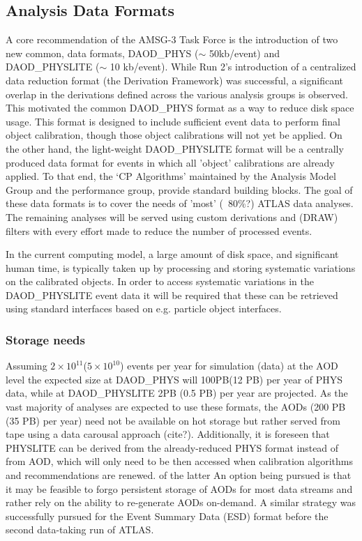 \subsection{Analysis Data Formats}


A core recommendation of the AMSG-3 Task Force\cite{amsg3} is the introduction of two new common, data formats, {\sc DAOD\_PHYS} ($\sim$ 50kb/event) and {\sc DAOD\_PHYSLITE} ($\sim$ 10 kb/event). 
While Run 2's introduction of a centralized data reduction format (the Derivation Framework) was successful, a significant overlap in the derivations defined across the various analysis groups is observed. This motivated the common {\sc DAOD\_PHYS} format as a way to reduce disk space usage. This format is designed to include sufficient event data to perform final object calibration, though those object calibrations will not yet be applied.
On the other hand, the light-weight {\sc DAOD\_PHYSLITE} format will be a centrally produced data format for events in which all 'object' calibrations are already applied. To that end, the `CP Algorithms' maintained by the Analysis Model Group and the performance group, provide standard building blocks.
The goal of these data formats is to cover the needs of 'most' (~80\%?) ATLAS data analyses.
The remaining analyses will be served using custom derivations and (DRAW) filters with every effort made to reduce the number of processed events.

In the current computing model, a large amount of disk space, and significant human time, is typically taken up by processing and storing systematic variations on the calibrated objects.
In order to access systematic variations in the {\sc DAOD\_PHYSLITE} event data it will be required that these can be retrieved using standard interfaces based on e.g. particle object interfaces.




\subsubsection{Storage needs}

Assuming $2 \times 10^{11}$\;($5\times 10^{10}$) events per year for simulation (data) at the AOD level the expected size at {\sc DAOD\_PHYS} will 100PB\;(12 PB) per year of {\sc PHYS} data, while at {\sc DAOD\_PHYSLITE} 2PB (0.5 PB) per year are projected. As the vast majority of analyses are expected to use these formats, the AODs (200 PB (35 PB) per year) need not be available on hot storage but rather served from tape using a data carousal approach (cite?). Additionally, it is foreseen that {\sc PHYSLITE} can be derived from the already-reduced {\sc PHYS} format instead of from {\sc AOD}, which will only need to be then accessed when calibration algorithms and recommendations are renewed. of the latter An option being pursued is that it may be feasible to forgo persistent storage of AODs for most data streams and rather rely on the ability to re-generate AODs on-demand. A similar strategy was successfully pursued for the Event Summary Data (ESD) format before the second data-taking run of ATLAS.

